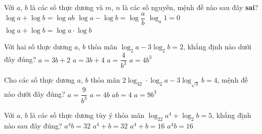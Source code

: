 \begin{ex}%
	Với $a$, $b$ là các số thực dương và $m$, $ n$  là các số nguyên, mệnh đề nào sau đây \textbf{sai}?
	 \choice
		{$\log a+\log b=\log  a b$}
		{$\log a-\log  b=\log \dfrac{a}{b}$}
		{$\log_a  1=0$}
		{\True $\log a+\log b=\log a \cdot  \log b$}
\end{ex}

\begin{ex}%
	Với hai số thực dương $a$, $b$ thỏa mãn $\log_2 a-3\log_2 b=2$,  khẳng định nào dưới đây đúng?
	 \choice
		 {$a=3b+2$}
		{$a=3b+4$} 
		{$a=\dfrac{4}{b^3}$} 
		 {\True $a=4b^3$}
\end{ex}

\begin{ex}%
	Cho các số thực dương $a$, $b$ thỏa mãn  $2\log_32\cdot \log_2a-3\log_{\sqrt 3}b=4$, mệnh đề nào dưới đây đúng?
	\choice 
		 {$a=\dfrac{9}{b^3}$}
		 {$a=4b$}
		 {$ab=4$}
		 {\True $a=9b^3$}
\end{ex}

\begin{ex}%
	Với $a$, $b$ là các số thực dương tùy  ý thỏa mãn $\log_22a^4+\log_2b=5$, khẳng định nào sau đây đúng?
	\choice 
		 {$a^4b=32$}
		 {$a^4+b=32$}
		{$a^4+b=16$} 
		{\True $a^4b=16$} 
\end{ex}

